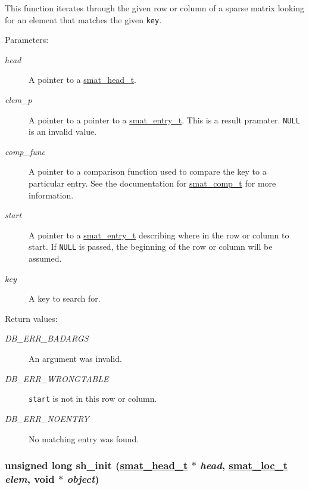 This function iterates through the given row or column of a sparse matrix looking for an element that matches the given {\tt key}.\begin{Desc}
\item[Parameters: ]\par
\begin{description}
\item[{\em 
head}]A pointer to a \hyperlink{group__dbprim__smat_a1}{smat\_\-head\_\-t}. \item[{\em 
elem\_\-p}]A pointer to a pointer to a \hyperlink{group__dbprim__smat_a2}{smat\_\-entry\_\-t}. This is a result pramater. {\tt NULL} is an invalid value. \item[{\em 
comp\_\-func}]A pointer to a comparison function used to compare the key to a particular entry. See the documentation for \hyperlink{group__dbprim__smat_a5}{smat\_\-comp\_\-t} for more information. \item[{\em 
start}]A pointer to a \hyperlink{group__dbprim__smat_a2}{smat\_\-entry\_\-t} describing where in the row or column to start. If {\tt NULL} is passed, the beginning of the row or column will be assumed. \item[{\em 
key}]A key to search for.\end{description}
\end{Desc}
\begin{Desc}
\item[Return values: ]\par
\begin{description}
\item[{\em 
DB\_\-ERR\_\-BADARGS}]An argument was invalid. \item[{\em 
DB\_\-ERR\_\-WRONGTABLE}]{\tt start} is not in this row or column. \item[{\em 
DB\_\-ERR\_\-NOENTRY}]No matching entry was found. \end{description}
\end{Desc}
\hypertarget{group__dbprim__smat_a17}{
\subsubsection[sh\_\-init]{\setlength{\rightskip}{0pt plus 5cm}unsigned long sh\_\-init (\hyperlink{group__dbprim__smat_a1}{smat\_\-head\_\-t} $\ast$ {\em head}, \hyperlink{group__dbprim__smat_a6}{smat\_\-loc\_\-t} {\em elem}, void $\ast$ {\em object})}}
\label{group__dbprim__smat_a17}


